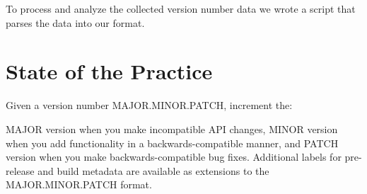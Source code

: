 \documentclass[conference]{IEEEtran}
\begin{document}
 
 
 To process and analyze the collected version number data we wrote a script that parses the data into our format. 










\section{State of the Practice}
\label{sec:Practice}


Given a version number MAJOR.MINOR.PATCH, increment the:

MAJOR version when you make incompatible API changes,
MINOR version when you add functionality in a backwards-compatible manner, and
PATCH version when you make backwards-compatible bug fixes.
Additional labels for pre-release and build metadata are available as extensions to the MAJOR.MINOR.PATCH format.
\end{document}
